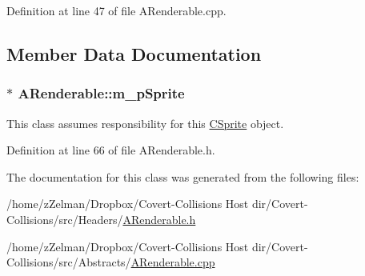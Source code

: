 Definition at line 47 of file A\-Renderable.\-cpp.



\subsection{Member Data Documentation}
\hypertarget{classARenderable_a6030df923c81b400e94ff1f6a9df41f8}{
\subsubsection[{m\-\_\-p\-Sprite}]{$\ast$ A\-Renderable\-::m\-\_\-p\-Sprite\hspace{0.3cm}{\ttfamily [protected]}}}\label{classARenderable_a6030df923c81b400e94ff1f6a9df41f8}


This class assumes responsibility for this \hyperlink{classCSprite}{C\-Sprite} object. 



Definition at line 66 of file A\-Renderable.\-h.



The documentation for this class was generated from the following files\-:\begin{DoxyCompactItemize}
\item 
/home/z\-Zelman/\-Dropbox/\-Covert-\/\-Collisions Host dir/\-Covert-\/\-Collisions/src/\-Headers/\hyperlink{ARenderable_8h}{A\-Renderable.\-h}\item 
/home/z\-Zelman/\-Dropbox/\-Covert-\/\-Collisions Host dir/\-Covert-\/\-Collisions/src/\-Abstracts/\hyperlink{ARenderable_8cpp}{A\-Renderable.\-cpp}\end{DoxyCompactItemize}
